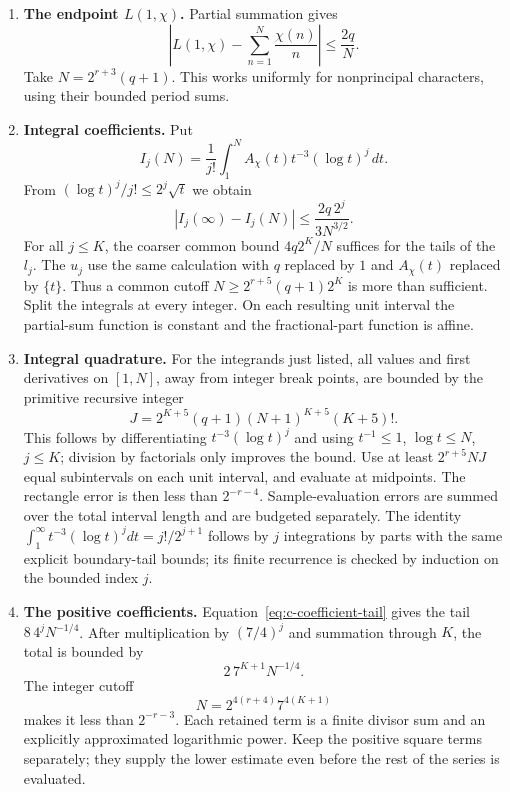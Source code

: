 \begin{enumerate}
\item \textbf{The endpoint $L(1,\chi)$.} Partial summation gives
\[
 \left|L(1,\chi)-\sum_{n=1}^{N}\frac{\chi(n)}n\right|\leq\frac{2q}{N}.
\]
Take $N=2^{r+3}(q+1)$. This works uniformly for nonprincipal characters, using their bounded period sums.

\item \textbf{Integral coefficients.} Put
\[
 I_j(N)=\frac1{j!}\int_1^N A_\chi(t)t^{-3}(\log t)^j\,dt.
\]
From $(\log t)^j/j!\leq2^j\sqrt t$ we obtain
\[
 |I_j(\infty)-I_j(N)|\leq\frac{2q\,2^j}{3N^{3/2}}.
\]
For all $j\leq K$, the coarser common bound $4q2^K/N$ suffices for the tails of the $l_j$. The $u_j$ use the same calculation with $q$ replaced by $1$ and $A_\chi(t)$ replaced by $\{t\}$. Thus a common cutoff $N\geq2^{r+5}(q+1)2^K$ is more than sufficient. Split the integrals at every integer. On each resulting unit interval the partial-sum function is constant and the fractional-part function is affine.

\item \textbf{Integral quadrature.} For the integrands just listed, all values and first derivatives on $[1,N]$, away from integer break points, are bounded by the primitive recursive integer
\[
 J=2^{K+5}(q+1)(N+1)^{K+5}(K+5)!.
\]
This follows by differentiating $t^{-3}(\log t)^j$ and using $t^{-1}\leq1$, $\log t\leq N$, $j\leq K$; division by factorials only improves the bound. Use at least $2^{r+5}NJ$ equal subintervals on each unit interval, and evaluate at midpoints. The rectangle error is then less than $2^{-r-4}$. Sample-evaluation errors are summed over the total interval length and are budgeted separately. The identity
$\int_1^\infty t^{-3}(\log t)^jdt=j!/2^{j+1}$ follows by $j$ integrations by parts with the same explicit boundary-tail bounds; its finite recurrence is checked by induction on the bounded index $j$.

\item \textbf{The positive coefficients.} Equation~\eqref{eq:c-coefficient-tail} gives the tail $8\,4^jN^{-1/4}$. After multiplication by $(7/4)^j$ and summation through $K$, the total is bounded by
\[
 2\,7^{K+1}N^{-1/4}.
\]
The integer cutoff
\[
 N=2^{4(r+4)}7^{4(K+1)}
\]
makes it less than $2^{-r-3}$. Each retained term is a finite divisor sum and an explicitly approximated logarithmic power. Keep the positive square terms separately; they supply the lower estimate even before the rest of the series is evaluated.


\end{enumerate}
